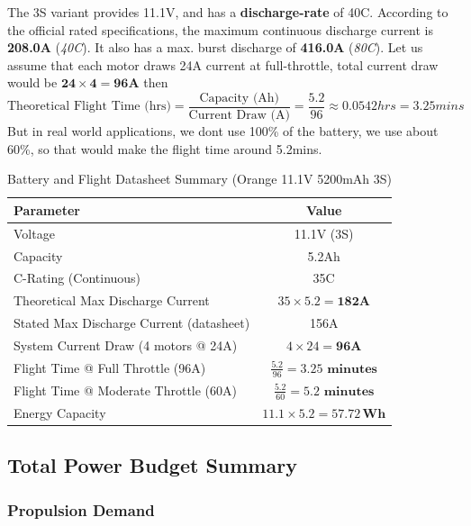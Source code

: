 \documentclass[12pt]{report}
\begin{document}
      The 3S variant provides 11.1V, and has a \textbf{discharge-rate} of 40C. According to the official rated specifications, the maximum continuous discharge current is \textbf{208.0A} (\textit{40C}). It also has a max. burst discharge of \textbf{416.0A} (\textit{80C}). Let us assume that each motor draws 24A current at full-throttle, total current draw would be $ \boldsymbol{24 \times 4 = 96A} $ then \vspace{0.5cm} \[ \text{Theoretical Flight Time (hrs)} = \frac{\text{Capacity (Ah)}}{\text{Current Draw (A)}} = \frac{5.2}{96} \approx 0.0542 hrs = 3.25 mins \] But in real world applications, we dont use 100\% of the battery, we use about 60\%, so that would make the flight time around 5.2mins. 
      \begin{table}[h!]
      \centering
      \caption{Battery and Flight Datasheet Summary (Orange 11.1V 5200mAh 3S)}
        \begin{tabular}{|l|c|}
          \hline
          \textbf{Parameter} & \textbf{Value} \\
          \hline
          Voltage & 11.1V (3S) \\
          \hline
          Capacity & 5.2Ah \\
          \hline
          C-Rating (Continuous) & 35C \\
          \hline
          Theoretical Max Discharge Current & $35 \times 5.2 = \mathbf{182A}$ \\
          \hline
          Stated Max Discharge Current (datasheet) & 156A \\
          \hline
          System Current Draw (4 motors @ 24A) & $4 \times 24 = \mathbf{96A}$ \\
          \hline
              Flight Time @ Full Throttle (96A) & $\frac{5.2}{96} = \mathbf{3.25 \text{ minutes}}$ \\
          \hline
          Flight Time @ Moderate Throttle (60A) & $\frac{5.2}{60} = \mathbf{5.2 \text{ minutes}}$ \\
          \hline
          Energy Capacity & $11.1 \times 5.2 = \mathbf{57.72\,Wh}$ \\
          \hline
        \end{tabular}
      \end{table}
    
      \subsection{Total Power Budget Summary}
        \subsubsection{Propulsion Demand}
\end{document}
